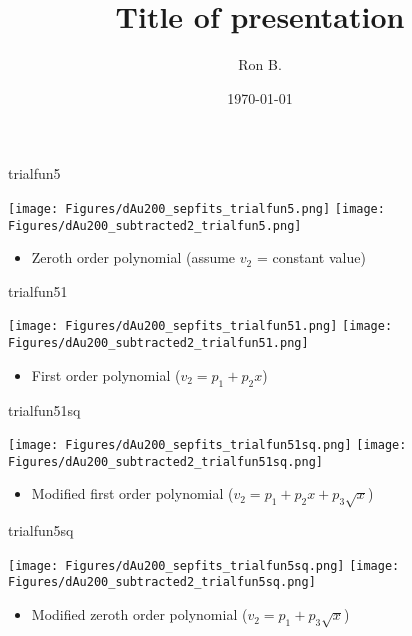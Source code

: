 \documentclass[aspectratio=169,compress,10pt]{beamer}
\title[Title of presentation]{Title of presentation}
\author[Ron B.]{Ron B.}
\institute[UNCG]{\normalsize University of North Carolina Greensboro}
\date[\today]{\today}
\begin{document}


\begin{frame}{trialfun5}
\begin{center}
\texttt{[image: Figures/dAu200\_sepfits\_trialfun5.png]}
\texttt{[image: Figures/dAu200\_subtracted2\_trialfun5.png]}
\end{center}
\begin{itemize}
\item Zeroth order polynomial (assume $v_2$ = constant value)
\end{itemize}
\end{frame}



\begin{frame}{trialfun51}
\begin{center}
\texttt{[image: Figures/dAu200\_sepfits\_trialfun51.png]}
\texttt{[image: Figures/dAu200\_subtracted2\_trialfun51.png]}
\end{center}
\begin{itemize}
\item First order polynomial ($v_2 = p_1 + p_2x$)
\end{itemize}
\end{frame}



\begin{frame}{trialfun51sq}
\begin{center}
\texttt{[image: Figures/dAu200\_sepfits\_trialfun51sq.png]}
\texttt{[image: Figures/dAu200\_subtracted2\_trialfun51sq.png]}
\end{center}
\begin{itemize}
\item Modified first order polynomial ($v_2 = p_1 + p_2x + p_3\sqrt{x}$)
\end{itemize}
\end{frame}



\begin{frame}{trialfun5sq}
\begin{center}
\texttt{[image: Figures/dAu200\_sepfits\_trialfun5sq.png]}
\texttt{[image: Figures/dAu200\_subtracted2\_trialfun5sq.png]}
\end{center}
\begin{itemize}
\item Modified zeroth order polynomial ($v_2 = p_1  + p_3\sqrt{x}$)
\end{itemize}
\end{frame}
\end{document}

